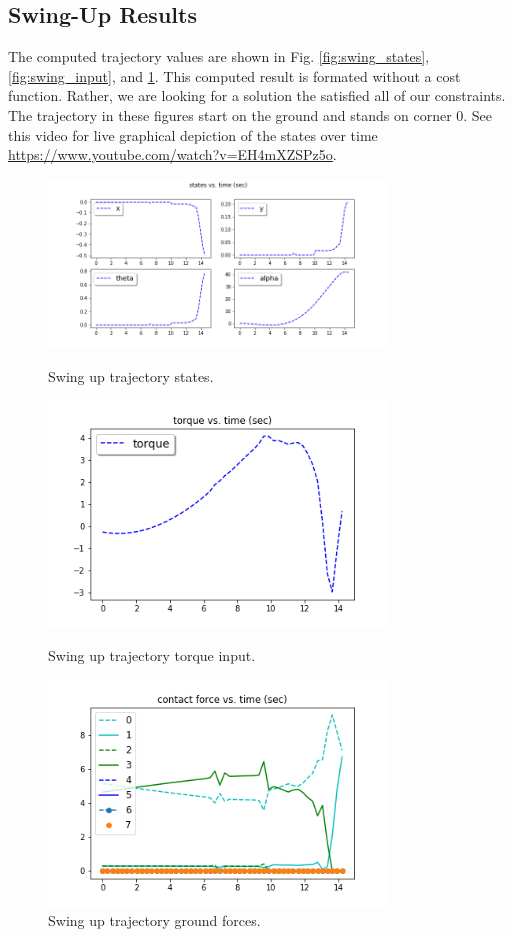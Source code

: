 \documentclass[conference]{IEEEtran}
\begin{document}
\subsection{Swing-Up Results}
The computed trajectory values are shown in Fig. \ref{fig:swing_states}, \ref{fig:swing_input}, and \ref{fig:swing_ground}. This computed result is formated without a cost function. Rather, we are looking for a solution the satisfied all of our constraints. The trajectory in these figures start on the ground and stands on corner 0. See this video for live graphical depiction of the states over time \url{https://www.youtube.com/watch?v=EH4mXZSPz5o}.

\begin{figure}[htbp]
\centerline{\includegraphics[width=9cm,keepaspectratio]{media/swing_up/swing_up_states.png}}
\caption{Swing up trajectory states.}
\label{fig:swing_states}
\centerline{\includegraphics[width=9cm,keepaspectratio]{media/swing_up/swing_up_torque.png}}
\caption{Swing up trajectory torque input.}
\label{fig:swing_input}
\centerline{\includegraphics[width=9cm,keepaspectratio]{media/swing_up/swing_up_ground_forces.png}}
\caption{Swing up trajectory ground forces.}
\label{fig:swing_ground}
\end{figure}
\end{document}
